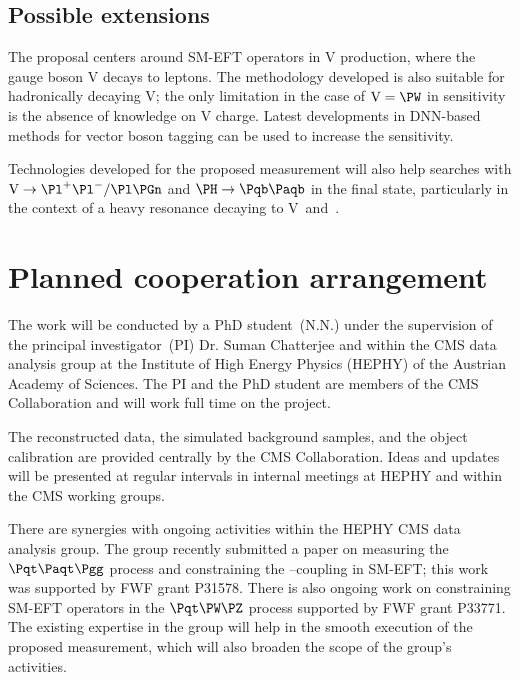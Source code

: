 \documentclass[a4paper,11pt]{article}
\newcommand{\Pb}{{{\Pqb}}\xspace}
\newcommand{\Pt}{{{\Pqt}}\xspace}
\newcommand{\PAb}{{{{\Paqb}}}\xspace}
\newcommand{\PAt}{{{{\Paqt}}}\xspace}
\renewcommand{\PV}{{{{V}}}\xspace}
\newcommand{\VH}{{{\PV}{\PH}}\xspace}
\begin{document}
\subsection{Possible extensions}

The proposal centers around SM-EFT operators in \VH production, where the gauge boson \PV decays to leptons. 
The methodology developed is also suitable for hadronically decaying \PV; 
the only limitation in the case of $\textrm{\PV}={\PW}$ in sensitivity is the absence of knowledge on \PV charge. 
Latest developments in DNN-based methods for vector boson tagging can be used to increase the sensitivity. 

Technologies developed for the proposed measurement will also help searches with $\textrm{\PV}\rightarrow \Pl^{+}\Pl^{-} / \Pl \Pgn$ and $\PH \to \Pb \PAb$ in the final state, particularly in the context of a heavy resonance decaying to \PV~and~{\PH}. %

\section{Planned cooperation arrangement} 

The work will be conducted by a PhD student~(N.N.) under the supervision of the principal investigator~(PI) Dr. Suman Chatterjee and within the  CMS data analysis group at the Institute of High Energy Physics (HEPHY) of the Austrian Academy of Sciences. The PI and the PhD student are members of the CMS Collaboration and will work full time on the project. 

The reconstructed data, the simulated background samples, and the object calibration are provided centrally by the CMS Collaboration. 
Ideas and updates will be presented at regular intervals in internal meetings at HEPHY and within the CMS working groups. 

There are synergies with ongoing activities within the HEPHY CMS data analysis group.
The group recently submitted a paper on measuring the $\Pt\PAt\Pgg$ process and constraining the \Pt--\Pgg coupling in SM-EFT; this work was supported by FWF grant P31578.
There is also ongoing work on constraining SM-EFT operators in the $\Pt\PW\PZ$ process supported by FWF grant P33771. 
The existing expertise in the group will help in the smooth execution of the proposed measurement, which will also broaden the scope of the group's activities.
\end{document}
